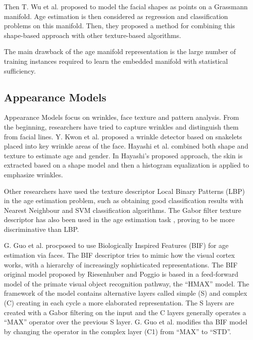 Then T. Wu et al. \cite{journals/tifs/WuTC12} proposed to model the facial shapes as points on a Grassmann manifold. Age estimation is then considered as regression and classification problems on this manifold. Then, they proposed a method for combining this shape-based approach with other texture-based algorithms.

The main drawback of the age manifold representation is the large number of training instances required to learn the embedded manifold with statistical sufficiency.

\subsection{Appearance Models}\label{subsec:BIF}

Appearance Models focus on wrinkles, face texture and pattern analysis. From the beginning, researchers have tried to capture wrinkles and distinguish them from facial lines. Y. Kwon et al. \cite{Kwon:1999:ACF:311844.311845} proposed a wrinkle detector based on snakelets \cite{Kass88snakes:active} placed into key wrinkle areas of the face. Hayashi et al. \cite{969698} \cite{1195171} \cite{conf/icpr/HayashiYIK02} combined both shape and texture to estimate age and gender. In Hayashi's proposed approach, the skin is extracted based on a shape model and then a histogram equalization is applied to emphasize wrinkles.

Other researchers have used the texture descriptor Local Binary Patterns (LBP) \cite{Ahonen:2006:FDL:1175897.1176245} in the age estimation problem, such as \cite{4717926} \cite{6460367} obtaining good classification results with Nearest Neighbour and SVM classification algorithms. The Gabor \cite{Liu:2002:GFB:2319007.2320264} filter texture descriptor has also been used in the age estimation task  \cite{Gao:2009:FAC:1567988.1568003}, proving to be more discriminative than LBP.

G. Guo et al. \cite{conf/cvpr/GuoMFH09} procposed to use Biologically Inspired Features (BIF) \cite{Riesenhuber99hierarchicalmodels} for age estimation via faces. The BIF descriptor tries to mimic how the visual cortex works, with a hierarchy of increasingly sophisticated representations. The BIF original model proposed by Riesenhuber and Poggio \cite{Riesenhuber99hierarchicalmodels} is based in a feed-forward model of the primate visual object recognition pathway, the ``HMAX'' model. The framework of the model contains alternative layers called simple (S) and complex (C) creating in each cycle a more elaborated representation. The S layers are created with a Gabor filtering on the input and the C layers generally operates a ``MAX'' operator over the previous S layer. G. Guo et al. \cite{conf/cvpr/GuoMFH09} modifies tha BIF model by changing the operator in the complex layer (C1) from ``MAX'' to ``STD''.

